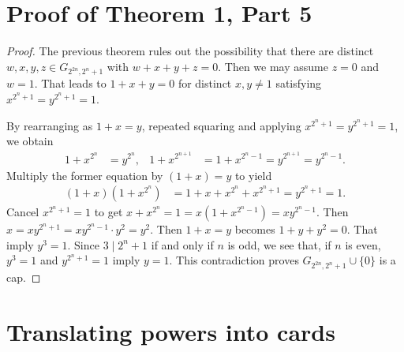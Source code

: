 \documentclass[12pt]{amsart}
\theoremstyle{definition}
\begin{document}
\section{Proof of Theorem 1, Part 5}

\begin{proof}
  The previous theorem rules out the possibility that there are
  distinct $w,x,y,z\in G_{2^{2n},2^n+1}$ with $w+x+y+z=0$.  Then we
  may assume $z=0$ and $w=1$. That leads to  $1+x+y=0$ for
  distinct $x,y\ne1$ satisfying $x^{2^n+1}=y^{2^n+1}=1$.

  By rearranging as $1+x=y$, repeated squaring and applying
  $x^{2^n+1}=y^{2^n+1}=1$, we obtain
  \begin{align*}
    1+x^{2^n}&=y^{2^n},
    & 1+x^{2^{n+1}}&=1+x^{2^n-1}=y^{2^{n+1}}=y^{2^n-1}.
  \end{align*}
  Multiply the former equation by $(1+x)=y$ to yield
  \begin{align*}
    (1+x)(1+x^{2^n})&=1+x+x^{2^n}+x^{2^n+1}=y^{2^n+1}=1.
  \end{align*}
  Cancel $x^{2^n+1}=1$ to get  $x+x^{2^n}=1
  =x(1+x^{2^n-1})=xy^{2^n-1}$.
  Then $x=xy^{2^n+1}=xy^{2^n-1}\cdot y^2=y^2$.
  Then $1+x=y$ becomes $1+y+y^2=0$. That imply $y^3=1$.
  Since $3\mid 2^n+1$ if and only if $n$ is odd,  we see that, if $n$
  is even, $y^3=1$ and $y^{2^n+1}=1$ imply $y=1$.
  This contradiction proves $G_{2^{2n},2^n+1}\cup\{0\}$ is a cap.
\end{proof}


\section{Translating powers into cards}
\end{document}

